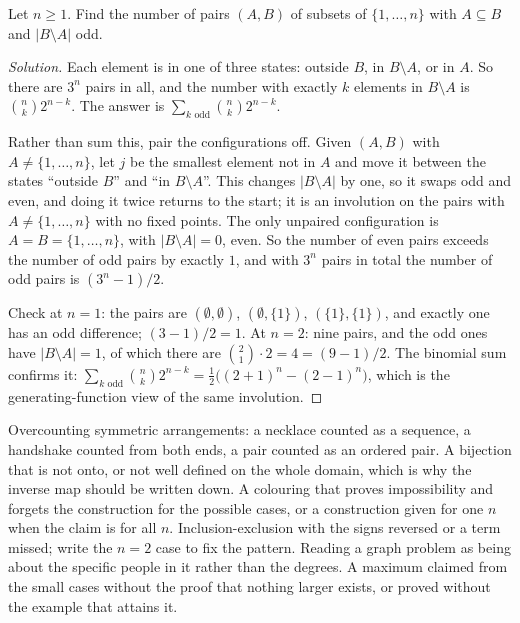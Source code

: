 \begin{example}
Let $n\ge 1$. Find the number of pairs $(A,B)$ of subsets of $\{1,\dots,n\}$ with $A\subseteq B$ and $|B\setminus A|$ odd.
\end{example}

\begin{proof}[Solution]
Each element is in one of three states: outside $B$, in $B\setminus A$, or in $A$. So there are $3^n$ pairs in all, and the number with exactly $k$ elements in $B\setminus A$ is $\binom nk2^{n-k}$. The answer is $\sum_{k\text{ odd}}\binom nk2^{n-k}$.

Rather than sum this, pair the configurations off. Given $(A,B)$ with $A\ne\{1,\dots,n\}$, let $j$ be the smallest element not in $A$ and move it between the states ``outside $B$'' and ``in $B\setminus A$''. This changes $|B\setminus A|$ by one, so it swaps odd and even, and doing it twice returns to the start; it is an involution on the pairs with $A\ne\{1,\dots,n\}$ with no fixed points. The only unpaired configuration is $A=B=\{1,\dots,n\}$, with $|B\setminus A|=0$, even. So the number of even pairs exceeds the number of odd pairs by exactly $1$, and with $3^n$ pairs in total the number of odd pairs is $(3^n-1)/2$.

Check at $n=1$: the pairs are $(\emptyset,\emptyset)$, $(\emptyset,\{1\})$, $(\{1\},\{1\})$, and exactly one has an odd difference; $(3-1)/2=1$. At $n=2$: nine pairs, and the odd ones have $|B\setminus A|=1$, of which there are $\binom21\cdot2=4=(9-1)/2$. The binomial sum confirms it: $\sum_{k\text{ odd}}\binom nk2^{n-k}=\tfrac12\bigl((2+1)^n-(2-1)^n\bigr)$, which is the generating-function view of the same involution.
\end{proof}

\begin{trap}
Overcounting symmetric arrangements: a necklace counted as a sequence, a handshake counted from both ends, a pair counted as an ordered pair. A bijection that is not onto, or not well defined on the whole domain, which is why the inverse map should be written down. A colouring that proves impossibility and forgets the construction for the possible cases, or a construction given for one $n$ when the claim is for all $n$. Inclusion-exclusion with the signs reversed or a term missed; write the $n=2$ case to fix the pattern. Reading a graph problem as being about the specific people in it rather than the degrees. A maximum claimed from the small cases without the proof that nothing larger exists, or proved without the example that attains it.
\end{trap}

